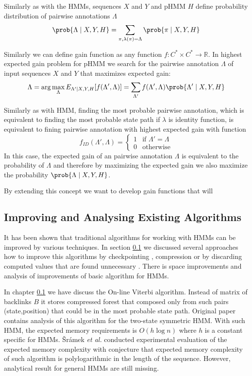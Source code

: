 Similarly as with the HMMs, sequences $X$ and $Y$ and pHMM $H$ define
probability distribution of pairwise annotations $\Lambda$
\[\prob{\Lambda\mid X,Y,H} = \sum_{\pi,\lambda(\pi)=\Lambda}\prob{\pi\mid
X,Y,H}\]

Similarly we can define gain function as any function $f:C^*\times C^*\to
\mathbb{R}$. In highest expected gain problem for pHMM we search for
the pairwise annotation $\Lambda$ of input sequences $X$ and $Y$ that maximizes
expected gain:
\[\Lambda = \arg\max_{\Lambda} E_{\Lambda'\mid X,Y,H}[f(\Lambda',\Lambda)]
=  \sum_{\Lambda'}f(\Lambda',\Lambda)\prob{\Lambda'\mid X,Y,H}\]

Similarly as with HMM, finding the most probable pairwise annotation, which is equivalent
to finding the most probable state path if $\lambda$ is identity function,
is equivalent to fining pairwise annotation with highest expected gain with
function
\[f_{ID}(\Lambda',\Lambda) = \begin{cases}
1 & \text{if $\Lambda'=\Lambda$}\\
0 & \text{otherwise}
\end{cases}\]
In this case, the expected gain of an pairwise annotation $\Lambda$ is
equivalent to the probability of $\Lambda$ and therefore by maximizing the
expected gain we also maximize the probability $\prob{\Lambda\mid X,Y,H}$.

By extending this concept we want to develop gain functions that will






\subsection{Improving and Analysing Existing Algorithms}

It has been shown that traditional algorithms for working with HMMs can be
improved by various techniques. In section \ref{} we discussed several
approaches how to improve this algorithms by checkpointing \cite{}, compression
\cite{} or by discarding computed values that are found unnecessary \cite{}.
There is space improvements and analysis of improvements of basic algorithm for
HMMs.

In chapter \ref{} we have discuss the  On-line Viterbi algorithm. Instead of
matrix of backlinks $B$ it stores compressed forest that composed only from such 
pairs (state,position) that could be in the most probable state path.
Original paper \cite{} contains analysis of this algorithm for the two-state
symmetric HMM. With such HMM, the expected memory requirements is $O(h\log n)$
where $h$ is a constant specific for HMMs. Šrámek {\it et al.} conducted
experimental evaluation of the expected memory complexity with conjecture that
expected memory complexity of such algorithm is polylogarithmic in the length of
the sequence. However, analytical result for general HMMs are still missing.

